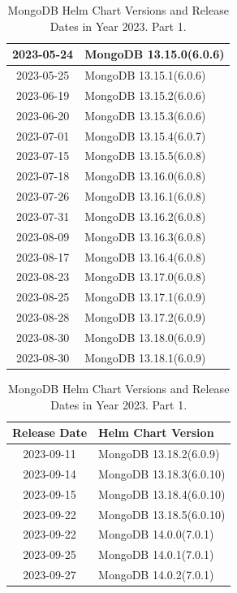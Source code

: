 \documentclass[../main.tex]{subfiles}
\begin{document}
\begin{table}[h]
\begin{minipage}{0.45\textwidth}
\begin{tabular}{|c|l|}
    2023-05-24 & MongoDB 13.15.0(6.0.6) \\ \hline  
    2023-05-25 & MongoDB 13.15.1(6.0.6) \\ \hline 
    2023-06-19 & MongoDB 13.15.2(6.0.6) \\ \hline 
    2023-06-20 & MongoDB 13.15.3(6.0.6) \\ \hline 
    2023-07-01 & MongoDB 13.15.4(6.0.7) \\ \hline 
    2023-07-15 & MongoDB 13.15.5(6.0.8) \\ \hline  
    2023-07-18 & MongoDB 13.16.0(6.0.8) \\ \hline 
    2023-07-26 & MongoDB 13.16.1(6.0.8) \\ \hline  
    2023-07-31 & MongoDB 13.16.2(6.0.8) \\ \hline
    2023-08-09 & MongoDB 13.16.3(6.0.8) \\ \hline
    2023-08-17 & MongoDB 13.16.4(6.0.8) \\ \hline  
    2023-08-23 & MongoDB 13.17.0(6.0.8) \\ \hline
    2023-08-25 & MongoDB 13.17.1(6.0.9) \\ \hline
    2023-08-28 & MongoDB 13.17.2(6.0.9) \\ \hline 
    2023-08-30 & MongoDB 13.18.0(6.0.9) \\ \hline  
    2023-08-30 & MongoDB 13.18.1(6.0.9) \\ \hline
\end{tabular}
\caption{MongoDB Helm Chart Versions and Release Dates in Year 2023. Part 1.}
\end{minipage}
\hspace{1cm} %
\begin{minipage}{0.45\textwidth}
\centering
\begin{tabular}{|c|l|}
\hline
\textbf{Release Date} & \textbf{Helm Chart Version} \\ \hline
    2023-09-11 & MongoDB 13.18.2(6.0.9) \\ \hline
    2023-09-14 & MongoDB 13.18.3(6.0.10) \\ \hline  
    2023-09-15 & MongoDB 13.18.4(6.0.10) \\ \hline  
    2023-09-22 & MongoDB 13.18.5(6.0.10) \\ \hline  
    2023-09-22 & MongoDB 14.0.0(7.0.1) \\ \hline  
    2023-09-25 & MongoDB 14.0.1(7.0.1) \\ \hline  
    2023-09-27 & MongoDB 14.0.2(7.0.1) \\ \hline  

\end{tabular}
\end{minipage}
\end{table}
\end{document}
